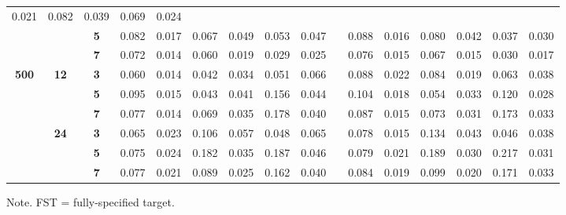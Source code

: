 \documentclass[a4paper,man,natbib]{apa6}
\begin{document}
\begin{table}[]
{\begin{tabular}{cccccccccccccccc}
			0.021 &
			0.082 &
			0.039 &
			0.069 &
			0.024 \\ \cline{3-16} 
			&
			&
			\textbf{5} &
			0.082 &
			0.017 &
			0.067 &
			0.049 &
			0.053 &
			0.047 &
			&
			0.088 &
			0.016 &
			0.080 &
			0.042 &
			0.037 &
			0.030 \\ \cline{3-16} 
			&
			&
			\textbf{7} &
			0.072 &
			0.014 &
			0.060 &
			0.019 &
			0.029 &
			0.025 &
			&
			0.076 &
			0.015 &
			0.067 &
			0.015 &
			0.030 &
			0.017 \\ \hline
			\multirow{6}{*}{\textbf{500}} &
			\multirow{3}{*}{\textbf{12}} &
			\textbf{3} &
			0.060 &
			0.014 &
			0.042 &
			0.034 &
			0.051 &
			0.066 &
			&
			0.088 &
			0.022 &
			0.084 &
			0.019 &
			0.063 &
			0.038 \\ \cline{3-16} 
			&
			&
			\textbf{5} &
			0.095 &
			0.015 &
			0.043 &
			0.041 &
			0.156 &
			0.044 &
			&
			0.104 &
			0.018 &
			0.054 &
			0.033 &
			0.120 &
			0.028 \\ \cline{3-16} 
			&
			&
			\textbf{7} &
			0.077 &
			0.014 &
			0.069 &
			0.035 &
			0.178 &
			0.040 &
			&
			0.087 &
			0.015 &
			0.073 &
			0.031 &
			0.173 &
			0.033 \\ \cline{2-16} 
			&
			\multirow{3}{*}{\textbf{24}} &
			\textbf{3} &
			0.065 &
			0.023 &
			0.106 &
			0.057 &
			0.048 &
			0.065 &
			&
			0.078 &
			0.015 &
			0.134 &
			0.043 &
			0.046 &
			0.038 \\ \cline{3-16} 
			&
			&
			\textbf{5} &
			0.075 &
			0.024 &
			0.182 &
			0.035 &
			0.187 &
			0.046 &
			&
			0.079 &
			0.021 &
			0.189 &
			0.030 &
			0.217 &
			0.031 \\ \cline{3-16} 
			&
			&
			\textbf{7} &
			0.077 &
			0.021 &
			0.089 &
			0.025 &
			0.162 &
			0.040 &
			&
			0.084 &
			0.019 &
			0.099 &
			0.020 &
			0.171 &
			0.033 \\ \hline
		\end{tabular}%
	}
\begin{tablenotes}[flushleft]
	\item Note. FST = fully-specified target.
\end{tablenotes}
\end{table}
\end{document}
